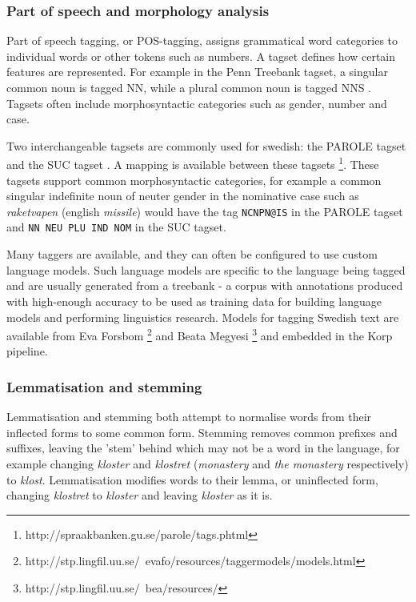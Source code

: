 \documentclass[a4paper]{report}
\newcommand{\todo}[1]{}
\begin{document}
\subsubsection{Part of speech and morphology analysis}

Part of speech tagging, or POS-tagging, assigns grammatical word categories to individual words or other tokens such as numbers.
A tagset defines how certain features are represented.
For example in the Penn Treebank tagset, a singular common noun is tagged NN, while a plural common noun is tagged NNS \citep{Marcus93Penn}.
Tagsets often include morphosyntactic categories such as gender, number and case.

Two interchangeable tagsets are commonly used for swedish: the PAROLE tagset and the SUC tagset \citep{Forsbom08Tagging}.
A mapping is available between these tagsets \footnote{http://spraakbanken.gu.se/parole/tags.phtml}.
These tagsets support common morphosyntactic categories, for example a common singular indefinite noun of neuter gender in the nominative case such as \emph{raketvapen} (english \emph{missile}) would have the tag {\tt NCNPN@IS} in the PAROLE tagset and {\tt NN NEU PLU IND NOM} in the SUC tagset.

Many taggers are available, and they can often be configured to use custom language models.
Such language models are specific to the language being tagged and are usually generated from a treebank - a corpus with annotations produced with high-enough accuracy to be used as training data for building language models and performing linguistics research.
Models for tagging Swedish text are available from Eva Forsbom \footnote{http://stp.lingfil.uu.se/~evafo/resources/taggermodels/models.html} and Beata Megyesi \footnote{http://stp.lingfil.uu.se/~bea/resources/} and embedded in the Korp pipeline. \todo{maybe something about tagger accuracy, some literature, this is lit-rev after all}

\subsubsection{Lemmatisation and stemming}

Lemmatisation and stemming both attempt to normalise words from their inflected forms to some common form.
Stemming removes common prefixes and suffixes, leaving the 'stem' behind which may not be a word in the language, for example changing \emph{kloster} and \emph{klostret} (\emph{monastery} and \emph{the monastery} respectively) to \emph{klost}.
Lemmatisation modifies words to their lemma, or uninflected form, changing \emph{klostret} to \emph{kloster} and leaving \emph{kloster} as it is.
\end{document}

